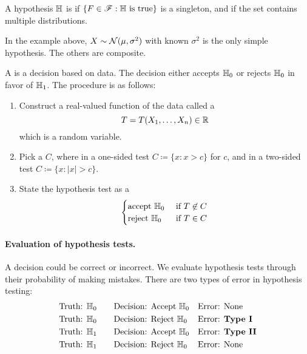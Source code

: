 \documentclass[10pt]{article}
\begin{document}
\begin{definition}
	A hypothesis $\mathbb{H}$ is  if $\{F \in \mathscr{F} : \mathbb{H} \text{ is true}\}$ is a singleton, and  if the set contains multiple distributions. 
\end{definition}

\begin{example}
	In the example above, $X \sim \mathcal{N}(\mu,\sigma^2)$ with known $\sigma^2$ is the only simple hypothesis. The others are composite.
\end{example}

\begin{definition}
	A  is a decision based on data. The decision either accepts $\mathbb{H}_0$ or rejects $\mathbb{H}_0$ in favor of $\mathbb{H}_1$. The procedure is as follows:
	\begin{enumerate}
		\item Construct a real-valued function of the data called a 
		\[
		T = T(X_1,\dots,X_n) \in \mathbb{R}
		\]
		which is a random variable.
		\item Pick a  $C$, where in a one-sided test $C \coloneqq \{x : x > c\}$ for  $c$, and in a two-sided test $C \coloneqq \{x : |x| > c\}$. 
		\item State the hypothesis test as a 
		\[
		\begin{cases} \text{accept } \mathbb{H}_0 & \text{ if } T \not\in C \\\text{reject } \mathbb{H}_0 & \text{ if } T \in C \end{cases}
		\]
	\end{enumerate}
\end{definition}

\paragraph{Evaluation of hypothesis tests.} A decision could be correct or incorrect. We evaluate hypothesis tests through their probability of making mistakes. There are two types of error in hypothesis testing:
\begin{align*}
	\text{Truth: } \mathbb{H}_0 &\qquad \text{Decision: Accept } \mathbb{H}_0 && \text{Error: None} \\
	\text{Truth: } \mathbb{H}_0 &\qquad \text{Decision: Reject } \mathbb{H}_0 && \text{Error: }\textbf{Type I} \\
	\text{Truth: } \mathbb{H}_1 &\qquad \text{Decision: Accept } \mathbb{H}_0 && \text{Error: }\textbf{Type II} \\
	\text{Truth: } \mathbb{H}_1 &\qquad \text{Decision: Reject } \mathbb{H}_0 && \text{Error: None} 
\end{align*}
\end{document}
